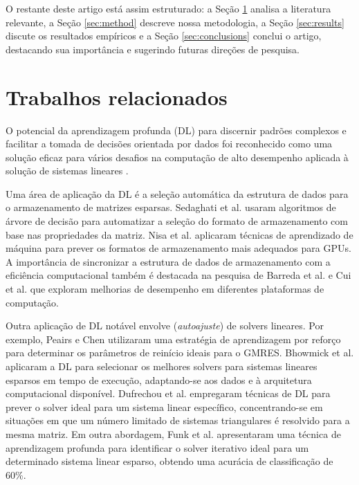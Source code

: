 \documentclass{pssbmac}
\begin{document}
O restante deste artigo está assim estruturado: a Seção \ref{sec:related} 
analisa a literatura relevante, a Seção \ref{sec:method} descreve nossa metodologia, 
a Seção \ref{sec:results} discute os resultados empíricos e a Seção \ref{sec:conclusions} 
conclui o artigo, destacando sua importância e sugerindo futuras direções de pesquisa.

\section{Trabalhos relacionados}\label{sec:related}

O potencial da aprendizagem profunda (DL) para discernir padrões complexos e 
facilitar a tomada de decisões orientada por dados foi reconhecido 
como uma solução eficaz para vários desafios na computação de alto desempenho 
aplicada à solução de sistemas lineares \cite{falch2017machine,tuncer2017diagnosing,memeti2019using}.

Uma área de aplicação da DL é a seleção automática da estrutura de dados 
para o armazenamento de matrizes esparsas. Sedaghati et al. \cite{sedaghati2015automatic}
usaram algoritmos de árvore de decisão para automatizar a seleção do formato de 
armazenamento com base nas propriedades da matriz. Nisa et al. \cite{nisa2018effective} 
aplicaram técnicas de aprendizado de máquina para prever os formatos de 
armazenamento mais adequados para GPUs. A importância de sincronizar a estrutura de dados 
de armazenamento com a eficiência computacional também é destacada na pesquisa de 
Barreda et al. \cite{barreda2020performance} e Cui et al. \cite{cui2016code} 
que exploram melhorias de desempenho em diferentes plataformas de computação.

Outra aplicação de DL notável envolve (\emph{autoajuste}) de solvers lineares. 
Por exemplo, Peairs e Chen \cite{peairs2011using} utilizaram uma estratégia de 
aprendizagem por reforço para determinar os parâmetros de reinício ideais para o 
GMRES. Bhowmick et al. \cite{bhowmick2006application} aplicaram a DL para selecionar 
os melhores solvers para sistemas lineares esparsos em tempo de execução, 
adaptando-se aos dados e à arquitetura computacional disponível. 
Dufrechou et al. \cite{dufrechou2019automatic} empregaram técnicas de DL 
para prever o solver ideal para um sistema linear específico, concentrando-se 
em situações em que um número limitado de sistemas triangulares é resolvido para a 
mesma matriz. 
Em outra abordagem, Funk et al. \cite{funk2022prediction} apresentaram uma técnica de 
aprendizagem profunda para identificar o solver iterativo ideal para 
um determinado sistema linear esparso, obtendo uma acurácia de classificação de 60\%.
\end{document}
